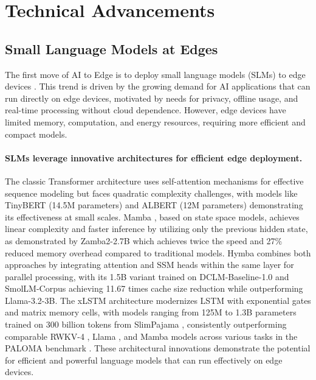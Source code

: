 \section{Technical Advancements}\label{sec:technical_advancements}

\subsection{Small Language Models at Edges}\label{subsec:small_language_models}


The first move of AI to Edge is to deploy small language models (SLMs) to edge devices \cite{lu2024small,wang2024comprehensive,van2024survey}. This trend is driven by the growing demand for AI applications that can run directly on edge devices, motivated by needs for privacy, offline usage, and real-time processing without cloud dependence. However, edge devices have limited memory, computation, and energy resources, requiring more efficient and compact models.


\paragraph{SLMs leverage innovative architectures for efficient edge deployment.}
The classic Transformer architecture \cite{vaswani2017attention} uses self-attention mechanisms for effective sequence modeling but faces quadratic complexity challenges, with models like TinyBERT \cite{jiao2020tinybert} (14.5M parameters) and ALBERT \cite{lan2020albert} (12M parameters) demonstrating its effectiveness at small scales. Mamba \cite{gu2023mamba}, based on state space models, achieves linear complexity and faster inference by utilizing only the previous hidden state, as demonstrated by Zamba2-2.7B \cite{glorioso2024zamba2} which achieves twice the speed and 27\% reduced memory overhead compared to traditional models. Hymba \cite{dong2024hymba} combines both approaches by integrating attention and SSM heads within the same layer for parallel processing, with its 1.5B variant trained on DCLM-Baseline-1.0 and SmolLM-Corpus achieving 11.67 times cache size reduction while outperforming Llama-3.2-3B. The xLSTM architecture \cite{beck2024xlstm} modernizes LSTM with exponential gates and matrix memory cells, with models ranging from 125M to 1.3B parameters trained on 300 billion tokens from SlimPajama \cite{cerebras2023slimpajama}, consistently outperforming comparable RWKV-4 \cite{peng-etal-2023-rwkv}, Llama \cite{touvron2023llama3}, and Mamba models across various tasks in the PALOMA benchmark \cite{magnusson2024paloma}. These architectural innovations demonstrate the potential for efficient and powerful language models that can run effectively on edge devices.


